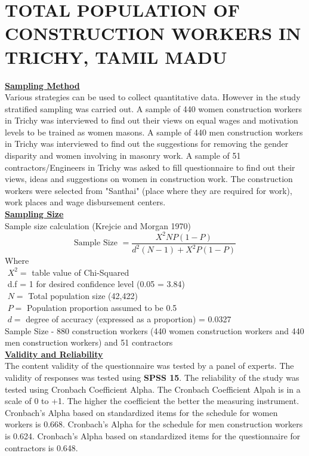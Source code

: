 \documentclass[12pt]{report}
\newcommand{\bt}[1]{\textbf{#1}}
\newcommand{\ubt}[1]{\textbf{\underline{#1}}}
\newcommand{\NI}{\noindent}
\begin{document}
	\section{TOTAL POPULATION OF CONSTRUCTION WORKERS IN TRICHY, TAMIL MADU}
	\ubt{Sampling Method}\\
	Various strategies can be used to collect quantitative data. However in the study stratified sampling was carried out. A sample of 440 women construction workers in Trichy was interviewed to find out their views on equal wages and motivation levels to be trained as women masons. A sample of 440 men construction workers in Trichy was interviewed to find out the suggestions for removing the gender disparity and women involving in masonry work. A sample of 51 contractors/Engineers in Trichy was asked to fill questionnaire to find out their views, ideas and suggestions on women in construction work. The construction workers were selected from "Santhai" (place where they are required for work), work places and wage disbursement centers.\\
	\ubt{Sampling Size}\\
	Sample size calculation (Krejcie and Morgan 1970)\\
	
	\begin{equation}
		\text{Sample Size }  = \frac{X^2 NP(1-P)}{d^2(N-1) + X^2P(1-P)} \tag{1}
	\end{equation}
	Where\\
	$\left.\right.$ \qquad\qquad $X^2=$ table value of Chi-Squared\\
	$\left.\right.$ \qquad\qquad d.f = 1 for desired confidence level (0.05 = 3.84)\\
	$\left.\right.$ \qquad\qquad $N=$ Total population size (42,422)\\
	$\left.\right.$ \qquad\qquad $P=$ Population proportion assumed to be 0.5\\
	$\left.\right.$ \qquad\qquad $d=$ degree of accuracy (expressed as a proportion) = 0.0327\\
	
	\NI Sample Size - 880 construction workers (440 women construction workers and 440 men construction workers) and 51 contractors\\
	
	\NI\ubt{Validity and Reliability}\\
	The content validity of the questionnaire was tested by a panel of experts. The validity of responses was tested using \bt{SPSS 15}. The reliability of the study was tested using Cronbach Coefficient Alpha. The Cronbach Coefficient Alpah is in a scale of 0 to +1. The higher the coefficient the better the measuring instrument. Cronbach's Alpha based on standardized items for the schedule for women workers is 0.668. Cronbach's Alpha for the schedule for men construction workers is 0.624. Cronbach's Alpha based on standardized items for the questionnaire for contractors is 0.648.\\
	
\end{document}
